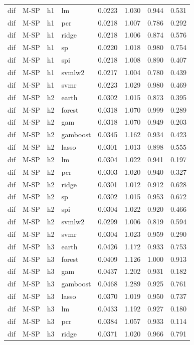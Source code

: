 \begin{ThreePartTable}
\begin{longtable}[t]{llclcccc}
dif & M-SP & h1 & lm & 0.0223 & 1.030 & 0.944 & 0.531\\
dif & M-SP & h1 & pcr & 0.0218 & 1.007 & 0.786 & 0.292\\
dif & M-SP & h1 & ridge & 0.0218 & 1.006 & 0.874 & 0.576\\
dif & M-SP & h1 & sp & 0.0220 & 1.018 & 0.980 & 0.754\\
dif & M-SP & h1 & spi & 0.0218 & 1.008 & 0.890 & 0.407\\
dif & M-SP & h1 & svmlw2 & 0.0217 & 1.004 & 0.780 & 0.439\\
dif & M-SP & h1 & svmr & 0.0223 & 1.029 & 0.980 & 0.469\\
\addlinespace
dif & M-SP & h2 & earth & 0.0302 & 1.015 & 0.873 & 0.395\\
dif & M-SP & h2 & forest & 0.0318 & 1.070 & 0.999 & 0.289\\
dif & M-SP & h2 & gam & 0.0318 & 1.070 & 0.949 & 0.203\\
dif & M-SP & h2 & gamboost & 0.0345 & 1.162 & 0.934 & 0.423\\
dif & M-SP & h2 & lasso & 0.0301 & 1.013 & 0.898 & 0.555\\
dif & M-SP & h2 & lm & 0.0304 & 1.022 & 0.941 & 0.197\\
dif & M-SP & h2 & pcr & 0.0303 & 1.020 & 0.940 & 0.327\\
dif & M-SP & h2 & ridge & 0.0301 & 1.012 & 0.912 & 0.628\\
dif & M-SP & h2 & sp & 0.0302 & 1.015 & 0.953 & 0.672\\
dif & M-SP & h2 & spi & 0.0304 & 1.022 & 0.920 & 0.466\\
dif & M-SP & h2 & svmlw2 & 0.0299 & 1.006 & 0.819 & 0.594\\
dif & M-SP & h2 & svmr & 0.0304 & 1.023 & 0.959 & 0.290\\
\addlinespace
dif & M-SP & h3 & earth & 0.0426 & 1.172 & 0.933 & 0.753\\
dif & M-SP & h3 & forest & 0.0409 & 1.126 & 1.000 & 0.913\\
dif & M-SP & h3 & gam & 0.0437 & 1.202 & 0.931 & 0.182\\
dif & M-SP & h3 & gamboost & 0.0468 & 1.289 & 0.925 & 0.761\\
dif & M-SP & h3 & lasso & 0.0370 & 1.019 & 0.950 & 0.737\\
dif & M-SP & h3 & lm & 0.0433 & 1.192 & 0.927 & 0.180\\
dif & M-SP & h3 & pcr & 0.0384 & 1.057 & 0.933 & 0.114\\
dif & M-SP & h3 & ridge & 0.0371 & 1.020 & 0.966 & 0.791\\

\end{longtable}
\end{ThreePartTable}
